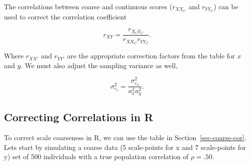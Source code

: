 \documentclass[
  letterpaper,
  DIV=11,
  numbers=noendperiod]{scrreprt}
\begin{document}
The correlations between coarse and continuous scores (\(r_{XX_C}\) and
\(r_{YY_C}\)) can be used to correct the correlation coefficient

\[
r_{XY} = \frac{r_{X_CY_C}}{r_{XX_C}r_{YY_C}}.
\]

Where \(r_{XX'}\) and \(r_{YY'}\) are the appropriate correction factors
from the table for \(x\) and \(y\). We must also adjust the sampling
variance as well,

\[
\sigma^2_{\varepsilon_c} = \frac{\sigma^2_{\varepsilon_o}}{a^2_x a^2_y}.
\]

\hypertarget{correcting-correlations-in-r}{%
\subsection{Correcting Correlations in
R}\label{correcting-correlations-in-r}}

To correct scale coarseness in R, we can use the table in
Section~\ref{sec-coarse-cor}. Lets start by simulating a coarse data (5
scale-points for x and 7 scale-points for y) set of 500 individuals with
a true population correlation of \(\rho = .50\).
\end{document}
